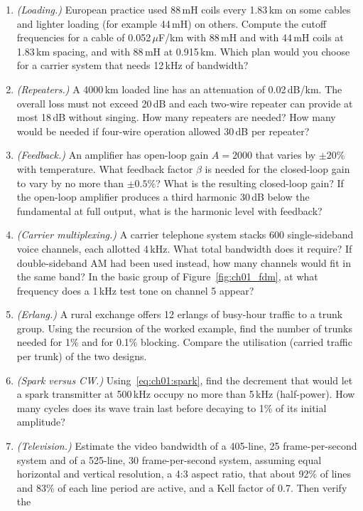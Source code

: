 \begin{enumerate}[label=\thechapter.\arabic*]
condition~\eqref{eq:ch01:distortionless}.
\item \emph{(Loading.)} European practice used 88\,mH coils every 1.83\,km on some cables and lighter
loading (for example 44\,mH) on others. Compute the cutoff frequencies for a cable of 0.052\,$\mu$F/km
with 88\,mH and with 44\,mH coils at 1.83\,km spacing, and with 88\,mH at 0.915\,km. Which plan would you
choose for a carrier system that needs 12\,kHz of bandwidth?
\item \emph{(Repeaters.)} A 4000\,km loaded line has an attenuation of 0.02\,dB/km. The overall loss must
not exceed 20\,dB and each two-wire repeater can provide at most 18\,dB without singing. How many
repeaters are needed? How many would be needed if four-wire operation allowed 30\,dB per repeater?
\item \emph{(Feedback.)} An amplifier has open-loop gain $A=2000$ that varies by $\pm20\%$ with temperature.
What feedback factor $\beta$ is needed for the closed-loop gain to vary by no more than $\pm0.5\%$? What is
the resulting closed-loop gain? If the open-loop amplifier produces a third harmonic 30\,dB below the
fundamental at full output, what is the harmonic level with feedback?
\item \emph{(Carrier multiplexing.)} A carrier telephone system stacks 600 single-sideband voice channels,
each allotted 4\,kHz. What total bandwidth does it require? If double-sideband AM had been used instead,
how many channels would fit in the same band? In the basic group of Figure~\ref{fig:ch01_fdm}, at what
frequency does a 1\,kHz test tone on channel 5 appear?
\item \emph{(Erlang.)} A rural exchange offers 12 erlangs of busy-hour traffic to a trunk group. Using the
recursion of the worked example, find the number of trunks needed for 1\% and for 0.1\% blocking. Compare
the utilisation (carried traffic per trunk) of the two designs.
\item \emph{(Spark versus CW.)} Using~\eqref{eq:ch01:spark}, find the decrement that would let a spark
transmitter at 500\,kHz occupy no more than 5\,kHz (half-power). How many cycles does its wave train
last before decaying to 1\% of its initial amplitude?
\item \emph{(Television.)} Estimate the video bandwidth of a 405-line, 25 frame-per-second system and of a
525-line, 30 frame-per-second system, assuming equal horizontal and vertical resolution, a 4:3 aspect ratio,
that about 92\% of lines and 83\% of each line period are active, and a Kell factor of 0.7. Then verify the

\end{enumerate}
